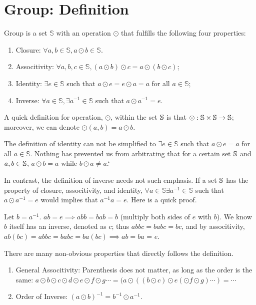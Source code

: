 \documentclass[../note.tex]{subfiles}
\begin{document}
\section{Group: Definition}

\begin{definition}[Group]
Group is a set $\mathbb{S}$ with an operation $\odot$ that fulfills the following four properties:
\begin{enumerate}
	\item Closure: $\forall a,b\in \mathbb{S}, a\odot b\in \mathbb{S}$.
	\item Associtivity: $\forall a, b, c \in \mathbb{S}, (a \odot b) \odot c = a \odot (b \odot c)$;
	\item Identity: $\exists e\in \mathbb{S}$ such that $a\odot e = e\odot a = a$ for all $a\in \mathbb{S}$;
	\item Inverse: $\forall a\in \mathbb{S}, \exists a^{-1}\in \mathbb{S}$ such that $a\odot a^{-1} = e$.
\end{enumerate}

\begin{remark}
	A quick definition for operation, $\odot $, within the set $\mathbb{S}$ is that $\odot: \mathbb{S}\times \mathbb{S} \rightarrow \mathbb{S}$; moreover, we can denote $\odot (a,b)=a \odot b$.

	The definition of identity can not be simplified to $\exists e\in \mathbb{S}$ such that $a\odot e = a$ for all $a\in \mathbb{S}$. 
	Nothing has prevented us from arbitrating that for a certain set $\mathbb{S}$ and $a, b \in \mathbb{S}$, $a \odot b = a$ while $b \odot a\neq a$.`

	In contrast, the definition of inverse needs not such emphasis. If a set $\mathbb{S}$ has the property of closure, associtivity, and identity, $\forall a\in \mathbb{S} \exists a^{-1}\in \mathbb{S}$ such that $a\odot a^{-1} = e$ would implies that $a^{-1}a = e$. Here is a quick proof.

	Let $b = a^{-1}$.
	$a b=e \implies a b b = b a b = b$ (multiply both sides of $e$ with $b$). We know $b$ itself has an inverse, denoted as $c$; thus $a b b c = b a b c = b c$, and by associtivity, $a b (b c) = a b b c = b a b c = ba(bc) \implies a b = b a$ = $e$.  
\end{remark}

\end{definition}
\begin{theorem}
There are many non-obvious properties that directly follows the definition.
\begin{enumerate}
	\item General Associtivity: Parenthesis does not matter, as long as the order is the same: 
		$a \odot b \odot c \odot d \odot e \odot f \odot g \cdots  = (a \odot ((b \odot c) \odot e (\odot f \odot g)\cdots) = \cdots$
	\item Order of Inverse: $(a \odot b)^{-1}=b^{-1}\odot a^{-1}$.  
\end{enumerate}
\end{theorem}
\end{document}

